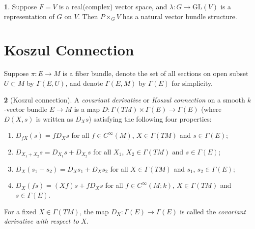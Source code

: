 \documentclass[11pt]{article}
\theoremstyle{definition}
\newtheorem{para}{}[part]
\begin{document}
\begin{para}
	Suppose $F=V$ is a real(complex) vector space, and $\lambda:G\to \mathrm{GL}(V)$ is a representation of $G$ on $V$. Then $P\times_G V$ has a natural vector bundle structure.
\end{para}

\section{Koszul Connection}

Suppose $\pi:E\to M$ is a fiber bundle, denote the set of all sections on open subset $U\subset M$ by $\Gamma(E,U)$, and denote $\Gamma(E,M)$ by $\Gamma(E)$ for simplicity.

\begin{para}[Koszul connection]
	A \textit{covariant derivative} or \textit{Koszul connection} on a smooth $k$-vector bundle $E\to M$ is a map $D:\Gamma(TM)\times \Gamma(E)\to \Gamma(E)$ (where $D(X,s)$ is written as $D_Xs$) satisfying the following four properties:
	\begin{enumerate}
	\item $D_{fX}(s)=fD_Xs$ for all $f\in C^\infty(M)$, $X\in \Gamma(TM)$ and $s\in \Gamma(E)$;
	\item $D_{X_1+X_2}s=D_{X_1}s+D_{X_2}s$ for all $X_1$, $X_2\in \Gamma(TM)$ and $s\in\Gamma(E)$;
	\item $D_X(s_1+s_2)=D_Xs_1+D_Xs_2$ for all $X\in \Gamma(TM)$ and $s_1$, $s_2\in \Gamma(E)$;
	\item $D_{X}(fs)=(Xf)s+fD_X s$ for all $f\in C^\infty (M;k)$, $X\in \Gamma(TM)$ and $s\in \Gamma(E)$.
	\end{enumerate}
	For a fixed $X\in \Gamma(TM)$, the map $D_X:\Gamma(E)\to \Gamma(E)$ is called the \textit{covariant derivative with respect to} $X$.
\end{para}
\end{document}
